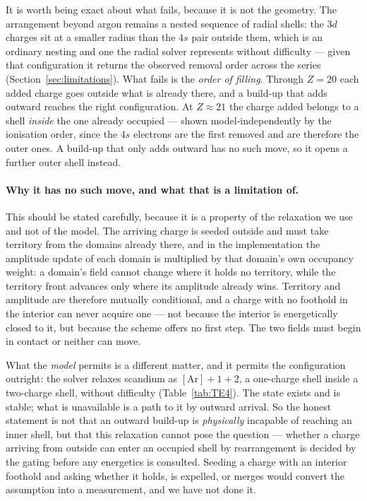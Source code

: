 \documentclass[11pt]{article}
\begin{document}
It is worth being exact about what fails, because it is not the geometry. The arrangement
beyond argon remains a nested sequence of radial shells: the $3d$ charges sit at a smaller
radius than the $4s$ pair outside them, which is an ordinary nesting and one the radial solver
represents without difficulty --- given that configuration it returns the observed removal order
across the series (Section~\ref{sec:limitations}). What fails is the \emph{order of filling}.
Through $Z=20$ each added charge goes outside what is already there, and a build-up that adds
outward reaches the right configuration. At $Z\approx21$ the charge added belongs to a shell
\emph{inside} the one already occupied --- shown model-independently by the ionisation order,
since the $4s$ electrons are the first removed and are therefore the outer ones. A build-up
that only adds outward has no such move, so it opens a further outer shell instead.

\paragraph{Why it has no such move, and what that is a limitation of.} This should be stated
carefully, because it is a property of the relaxation we use and not of the model. The arriving
charge is seeded outside and must take territory from the domains already there, and in the
implementation the amplitude update of each domain is multiplied by that domain's own occupancy
weight: a domain's field cannot change where it holds no territory, while the territory front
advances only where its amplitude already wins. Territory and amplitude are therefore mutually
conditional, and a charge with no foothold in the interior can never acquire one --- not because
the interior is energetically closed to it, but because the scheme offers no first step. The two
fields must begin in contact or neither can move.

What the \emph{model} permits is a different matter, and it permits the configuration outright: the
solver relaxes scandium as $[\mathrm{Ar}]{+}1{+}2$, a one-charge shell inside a two-charge shell,
without difficulty (Table~\ref{tab:TE4}). The state exists and is stable; what is unavailable is a
path to it by outward arrival. So the honest statement is not that an outward build-up is
\emph{physically} incapable of reaching an inner shell, but that this relaxation cannot pose the
question --- whether a charge arriving from outside can enter an occupied shell by rearrangement is
decided by the gating before any energetics is consulted. Seeding a charge with an interior foothold
and asking whether it holds, is expelled, or merges would convert the assumption into a measurement,
and we have not done it.
\end{document}
